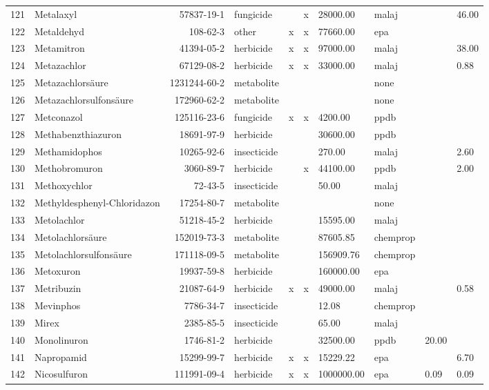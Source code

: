 \begin{longtable}{lp{3cm}rlp{0.5cm}p{0.5cm}p{1.5cm}p{1cm}p{1cm}p{1cm}}
  121 & Metalaxyl & 57837-19-1 & fungicide &  & x & 28000.00 & malaj &  & 46.00 \\ 
  122 & Metaldehyd & 108-62-3 & other & x & x & 77660.00 & epa &  &  \\ 
  123 & Metamitron & 41394-05-2 & herbicide & x & x & 97000.00 & malaj &  & 38.00 \\ 
  124 & Metazachlor & 67129-08-2 & herbicide & x & x & 33000.00 & malaj &  & 0.88 \\ 
  125 & Metazachlorsäure & 1231244-60-2 & metabolite &  &  &  & none &  &  \\ 
  126 & Metazachlorsulfonsäure & 172960-62-2 & metabolite &  &  &  & none &  &  \\ 
  127 & Metconazol & 125116-23-6 & fungicide & x & x & 4200.00 & ppdb &  &  \\ 
  128 & Methabenzthiazuron & 18691-97-9 & herbicide &  &  & 30600.00 & ppdb &  &  \\ 
  129 & Methamidophos & 10265-92-6 & insecticide &  &  & 270.00 & malaj &  & 2.60 \\ 
  130 & Methobromuron & 3060-89-7 & herbicide &  & x & 44100.00 & ppdb &  & 2.00 \\ 
  131 & Methoxychlor & 72-43-5 & insecticide &  &  & 50.00 & malaj &  &  \\ 
  132 & Methyldesphenyl-Chloridazon & 17254-80-7 & metabolite &  &  &  & none &  &  \\ 
  133 & Metolachlor & 51218-45-2 & herbicide &  &  & 15595.00 & malaj &  &  \\ 
  134 & Metolachlorsäure & 152019-73-3 & metabolite &  &  & 87605.85 & chemprop &  &  \\ 
  135 & Metolachlorsulfonsäure & 171118-09-5 & metabolite &  &  & 156909.76 & chemprop &  &  \\ 
  136 & Metoxuron & 19937-59-8 & herbicide &  &  & 160000.00 & epa &  &  \\ 
  137 & Metribuzin & 21087-64-9 & herbicide & x & x & 49000.00 & malaj &  & 0.58 \\ 
  138 & Mevinphos & 7786-34-7 & insecticide &  &  & 12.08 & chemprop &  &  \\ 
  139 & Mirex & 2385-85-5 & insecticide &  &  & 65.00 & malaj &  &  \\ 
  140 & Monolinuron & 1746-81-2 & herbicide &  &  & 32500.00 & ppdb & 20.00 &  \\ 
  141 & Napropamid & 15299-99-7 & herbicide & x & x & 15229.22 & epa &  & 6.70 \\ 
  142 & Nicosulfuron & 111991-09-4 & herbicide & x & x & 1000000.00 & epa & 0.09 & 0.09 \\ 

\end{longtable}
